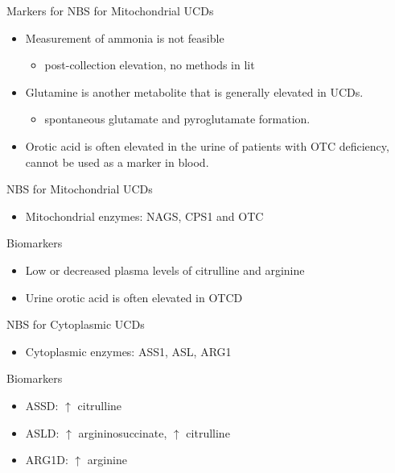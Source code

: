 \documentclass[presentation, smaller]{beamer}
\begin{document}
\begin{frame}[label={sec:orgheadline9}]{Markers for NBS for Mitochondrial UCDs}
\begin{itemize}
\item Measurement of ammonia is not feasible
\begin{itemize}
\item post-collection elevation, no methods in lit
\end{itemize}
\item Glutamine is another metabolite that is generally elevated in UCDs.
\begin{itemize}
\item spontaneous glutamate and pyroglutamate formation.
\end{itemize}
\item Orotic acid is often elevated in the urine of patients with
OTC deficiency, cannot be used as a marker in blood.
\end{itemize}
\end{frame}

\begin{frame}[label={sec:orgheadline10}]{NBS for Mitochondrial UCDs}
\begin{itemize}
\item Mitochondrial enzymes: NAGS, CPS1 and OTC
\end{itemize}

\begin{block}{Biomarkers}
\begin{itemize}
\item Low or decreased plasma levels of citrulline and arginine
\item Urine orotic acid is often elevated in OTCD
\end{itemize}
\end{block}
\end{frame}

\begin{frame}[label={sec:orgheadline11}]{NBS for Cytoplasmic UCDs}
\begin{itemize}
\item Cytoplasmic enzymes: ASS1, ASL, ARG1
\end{itemize}

\begin{block}{Biomarkers}
\begin{itemize}
\item ASSD: \(\uparrow\) citrulline
\item ASLD: \(\uparrow\) argininosuccinate, \(\uparrow\) citrulline
\item ARG1D: \(\uparrow\) arginine
\end{itemize}
\end{block}
\end{frame}
\end{document}
